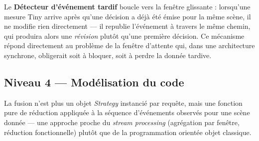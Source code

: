\documentclass[11pt,a4paper]{article}
\begin{document}
\begin{center}
\end{center}

Le \textbf{Détecteur d'événement tardif} boucle vers la fenêtre glissante : lorsqu'une mesure
Tiny arrive après qu'une décision a déjà été émise pour la même scène, il ne modifie rien
directement --- il republie l'événement à travers le même chemin, qui produira alors une
\emph{révision} plutôt qu'une première décision. Ce mécanisme répond directement au problème
de la fenêtre d'attente qui, dans une architecture synchrone, obligerait soit à bloquer, soit à
perdre la donnée tardive.

\subsection{Niveau 4 --- Modélisation du code}

La fusion n'est plus un objet \emph{Strategy} instancié par requête, mais une fonction pure de
réduction appliquée à la séquence d'événements observés pour une scène donnée --- une approche
proche du \emph{stream processing} (agrégation par fenêtre, réduction fonctionnelle) plutôt que
de la programmation orientée objet classique.
\end{document}
